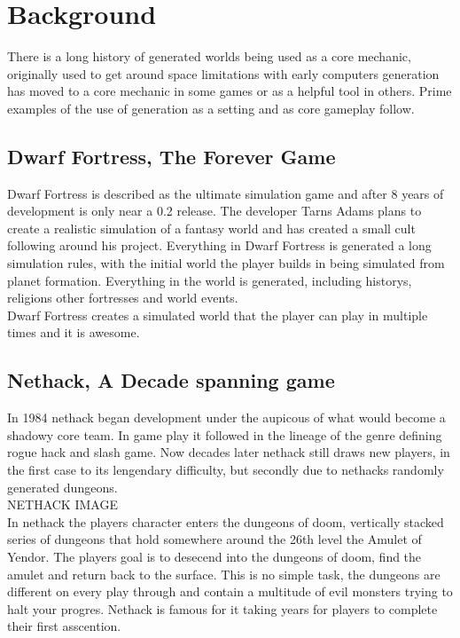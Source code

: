\section{Background}
There is a long history of generated worlds being used as a core mechanic, 
originally used to get around space limitations with early computers generation
has moved to a core mechanic in some games or as a helpful tool in others. Prime
examples of the use of generation as a setting and as core gameplay follow.\\

\subsection*{Dwarf Fortress, The Forever Game}
Dwarf Fortress is described as the ultimate simulation game and after 8 years of
development is only near a 0.2 release. The developer Tarns Adams plans to create
a realistic simulation of a fantasy world and has created a small cult following
around his project. Everything in Dwarf Fortress is generated a long simulation
rules, with the initial world the player builds in being simulated from planet 
formation. Everything in the world is generated, including historys, religions
other fortresses and world events. \\

Dwarf Fortress creates a simulated world that the player can play in multiple 
times and it is awesome.\\

\subsection*{Nethack, A Decade spanning game}
In 1984 nethack began development under the aupicous of what would become a 
shadowy core team. In game play it followed in the lineage of the genre defining
rogue hack and slash game. Now decades later nethack still draws new players,
in the first case to its lengendary difficulty, but secondly due to nethacks 
randomly generated dungeons.\\ 

NETHACK IMAGE\\

In nethack the players character enters the dungeons of doom, vertically stacked
series of dungeons that hold somewhere around the 26th level the Amulet of 
Yendor. The players goal is to desecend into the dungeons of doom, find the
amulet and return back to the surface. This is no simple task, the dungeons are 
different on every play through and contain a multitude of evil monsters trying
to halt your progres. Nethack is famous for it taking years for players to 
complete their first asscention.\\

